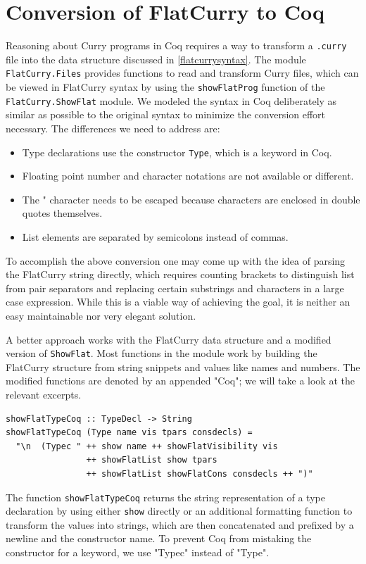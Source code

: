 \documentclass[fleqn, abstract=on]{scrreprt}
\newcommand{\coqinline}[1]{\texttt{#1}}
\begin{document}
\section{Conversion of FlatCurry to Coq}
Reasoning about Curry programs in Coq requires a way to transform a \texttt{.curry} file into the data structure discussed in \autoref{flatcurrysyntax}. The module \texttt{FlatCurry.Files} provides functions to read and transform Curry files, which can be viewed in FlatCurry syntax by using the \texttt{showFlatProg} function of the \texttt{FlatCurry.ShowFlat} module. We modeled the syntax in Coq deliberately as similar as possible to the original syntax to minimize the conversion effort necessary. The differences we need to address are:
\begin{itemize}
	\item Type declarations use the constructor \coqinline{Type}, which is a keyword in Coq.
	\item Floating point number and character notations are not available or different.
	\item The " character needs to be escaped because characters are enclosed in double quotes themselves.
	\item List elements are separated by semicolons instead of commas.
\end{itemize}
To accomplish the above conversion one may come up with the idea of parsing the FlatCurry string directly, which requires counting brackets to distinguish list from pair separators and replacing certain substrings and characters in a large case expression. While this is a viable way of achieving the goal, it is neither an easy maintainable nor very elegant solution.
\par
A better approach works with the FlatCurry data structure and a modified version of \texttt{ShowFlat}. Most functions in the module work by building the FlatCurry structure from string snippets and values like names and numbers. The modified functions are denoted by an appended "Coq"; we will take a look at the relevant excerpts.
\begin{verbatim}
showFlatTypeCoq :: TypeDecl -> String
showFlatTypeCoq (Type name vis tpars consdecls) =
  "\n  (Typec " ++ show name ++ showFlatVisibility vis
                ++ showFlatList show tpars
                ++ showFlatList showFlatCons consdecls ++ ")"
\end{verbatim}
The function \texttt{showFlatTypeCoq} returns the string representation of a type declaration by using either \texttt{show} directly or an additional formatting function to transform the values into strings, which are then concatenated and prefixed by a newline and the constructor name. To prevent Coq from mistaking the constructor for a keyword,  we use "Typec" instead of "Type".
\end{document}
